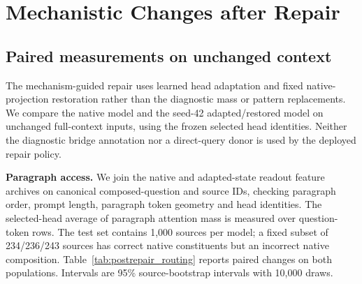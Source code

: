 \section{Mechanistic Changes after Repair}\label{app:postrepair}
\subsection{Paired measurements on unchanged context}
The mechanism-guided repair uses learned head adaptation and fixed native-projection restoration rather than the diagnostic mass or pattern replacements. We compare the native model and the seed-42 adapted/restored model on unchanged full-context inputs, using the frozen selected head identities. Neither the diagnostic bridge annotation nor a direct-query donor is used by the deployed repair policy.

\textbf{Paragraph access.} We join the native and adapted-state readout feature archives on canonical composed-question and source IDs, checking paragraph order, prompt length, paragraph token geometry and head identities. The selected-head average of paragraph attention mass is measured over question-token rows. The test set contains 1,000 sources per model; a fixed subset of 234/236/243 sources has correct native constituents but an incorrect native composition. Table~\ref{tab:postrepair_routing} reports paired changes on both populations. Intervals are 95\% source-bootstrap intervals with 10,000 draws.

